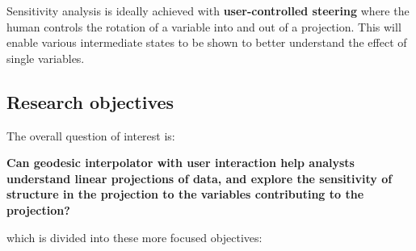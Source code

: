 \documentclass[
  11,
]{article}
\begin{document}
Sensitivity analysis is ideally achieved with \textbf{user-controlled steering} where the human controls the rotation of a variable into and out of a projection. This will enable various intermediate states to be shown to better understand the effect of single variables.

\hypertarget{research-objectives}{%
\subsection{Research objectives}\label{research-objectives}}

The overall question of interest is:

\textbf{Can geodesic interpolator with user interaction help analysts understand linear projections of data, and explore the sensitivity of structure in the projection to the variables contributing to the projection?}

which is divided into these more focused objectives:
\end{document}

